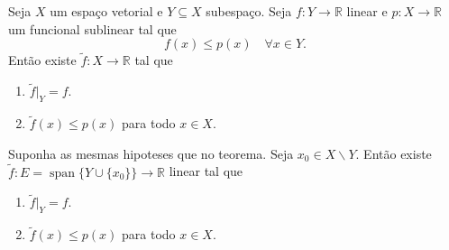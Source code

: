 \documentclass[portuguese]{article}
\theoremstyle{definition}
\newcommand{\R}{\mathbb{R}}
\begin{document}
	\begin{teo}
		Seja $X$ um espaço vetorial e $Y\subseteq X$ subespaço. Seja $f:Y\to\R$ linear e $p:X\to\R$ um funcional sublinear tal que
		\[f(x)\leq p(x)\quad\forall x\in Y.\]
		Então existe $\tilde{f}:X\to\R$ tal que
		\begin{enumerate}
			\item $\tilde{f}|_Y=f$.
			\item $\tilde{f}(x)\leq p(x)$ para todo $x\in X$.
		\end{enumerate}
	\end{teo}
	\begin{lema}
		Suponha as mesmas hipoteses que no teorema. Seja $x_0\in X\backslash Y$. Então existe $\tilde{f}:E=\operatorname{span}\{Y\cup\{x_0\}\}\to\R$ linear tal que
		\begin{enumerate}
			\item $\tilde{f}|_Y=f$.
			\item $\tilde{f}(x)\leq p(x)$ para todo $x\in X$.
		\end{enumerate}
	\end{lema}
\end{document}

